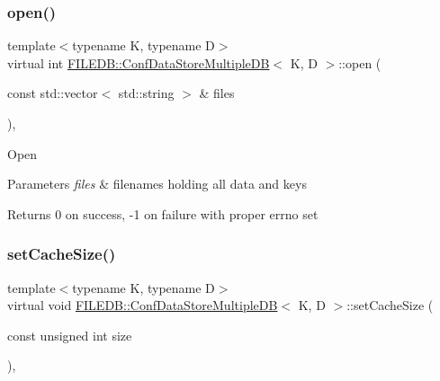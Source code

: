 \subsubsection{\texorpdfstring{open()}{open()}\hspace{0.1cm}{\footnotesize\ttfamily [3/3]}}
{\footnotesize\ttfamily template$<$typename K, typename D$>$ \\
virtual int \mbox{\hyperlink{classFILEDB_1_1ConfDataStoreMultipleDB}{F\+I\+L\+E\+D\+B\+::\+Conf\+Data\+Store\+Multiple\+DB}}$<$ K, D $>$\+::open (\begin{DoxyParamCaption}\item[{const std\+::vector$<$ std\+::string $>$ \&}]{files }\end{DoxyParamCaption})\hspace{0.3cm}{\ttfamily [inline]}, {\ttfamily [virtual]}}

Open 
\begin{DoxyParams}{Parameters}
{\em files} & filenames holding all data and keys\\
\hline
\end{DoxyParams}
\begin{DoxyReturn}{Returns}
0 on success, -\/1 on failure with proper errno set 
\end{DoxyReturn}
\mbox{\label{classFILEDB_1_1ConfDataStoreMultipleDB_a37115269cf1f8f04c49ab888b040fa13}} 
\subsubsection{\texorpdfstring{setCacheSize()}{setCacheSize()}\hspace{0.1cm}{\footnotesize\ttfamily [1/3]}}
{\footnotesize\ttfamily template$<$typename K, typename D$>$ \\
virtual void \mbox{\hyperlink{classFILEDB_1_1ConfDataStoreMultipleDB}{F\+I\+L\+E\+D\+B\+::\+Conf\+Data\+Store\+Multiple\+DB}}$<$ K, D $>$\+::set\+Cache\+Size (\begin{DoxyParamCaption}\item[{const unsigned int}]{size }\end{DoxyParamCaption})\hspace{0.3cm}{\ttfamily [inline]}, {\ttfamily [virtual]}}

